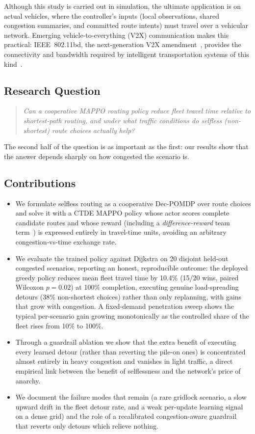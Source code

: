 Although this study is carried out in simulation, the ultimate application is on actual
vehicles, where the controller's inputs (local observations, shared congestion
summaries, and committed route intents) must travel over a vehicular network. Emerging
vehicle-to-everything (V2X) communication makes this practical: IEEE~802.11bd, the
next-generation V2X amendment~\citep{ieee80211bd}, provides the connectivity and
bandwidth required by intelligent transportation systems of this kind~\citep{iliopoulos2025bd}.

\subsection{Research Question}
\begin{quote}
\emph{Can a cooperative MAPPO routing policy reduce fleet travel time relative to
shortest-path routing, and under what traffic conditions do selfless (non-shortest)
route choices actually help?}
\end{quote}
The second half of the question is as important as the first: our results show that the
answer depends sharply on how congested the scenario is.

\subsection{Contributions}
\begin{itemize}
  \item We formulate selfless routing as a cooperative Dec-POMDP over route choices and
  solve it with a CTDE MAPPO policy whose actor scores complete candidate routes and
  whose reward (including a \emph{difference-reward} team term~\citep{wolpert2001collectives})
  is expressed entirely in travel-time units, avoiding an arbitrary congestion-vs-time
  exchange rate.
  \item We evaluate the trained policy against Dijkstra on 20 disjoint held-out congested
  scenarios, reporting an honest, reproducible outcome: the deployed greedy policy reduces
  mean fleet travel time by 10.4\% (15/20 wins, paired Wilcoxon $p{=}0.02$) at 100\%
  completion, executing genuine load-spreading detours (38\% non-shortest choices) rather
  than only replanning, with gains that grow with congestion. A fixed-demand penetration
  sweep shows the typical per-scenario gain growing monotonically as the controlled share
  of the fleet rises from 10\% to 100\%.
  \item Through a guardrail ablation we show that the extra benefit of executing every
  learned detour (rather than reverting the pile-on ones) is concentrated almost entirely
  in heavy congestion and vanishes in light traffic, a direct empirical link between the
  benefit of selflessness and the network's price of anarchy.
  \item We document the failure modes that remain (a rare gridlock scenario, a slow upward
  drift in the fleet detour rate, and a weak per-update learning signal on a dense grid)
  and the role of a recalibrated congestion-aware guardrail that reverts only detours which
  relieve nothing.
\end{itemize}
